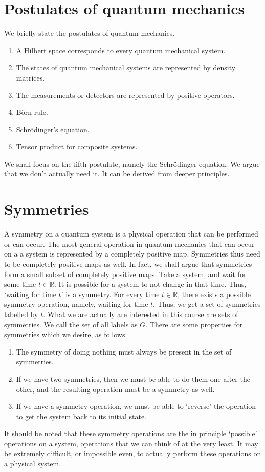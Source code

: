 \documentclass[a4 paper, 12pt]{book}
\theoremstyle{definition}
\newcommand{\rr}{\mathbb{R}}
\begin{document}
	\section{Postulates of quantum mechanics}

	We briefly state the postulates of quantum mechanics.
	\begin{enumerate}
	    \item A Hilbert space corresponds to every quantum mechanical system.
		\item The states of quantum mechanical systems are represented by density matrices.
		\item The measurements or detectors are represented by positive operators.
		\item B\"orn rule.
		\item Schr\"odinger's equation.
		\item Tensor product for composite systems.
	\end{enumerate}
	We shall focus on the fifth postulate, namely the Schr\"odinger equation. We argue that we don't actually need it. It can be derived from deeper principles.

	\section{Symmetries}

	A symmetry on a quantum system is a physical operation that can be performed or can occur. The most general operation in quantum mechanics that can occur on a a system is represented by a completely positive map. Symmetries thus need to be completely positive maps as well. In fact, we shall argue that symmetries form a small subset of completely positive maps.
	Take a system, and wait for some time \(t \in \rr\). It is possible for a system to not change in that time. Thus, `waiting for time \(t\)' is a symmetry. For every time \(t \in \rr\), there exists a possible symmetry operation, namely, waiting for time \(t\). Thus, we get a set of symmetries labelled by \(t\). What we are actually are interested in this course are sets of symmetries. We call the set of all labels as \(G\). There are some properties for symmetries which we desire, as follows.
	\begin{enumerate}
	    \item The symmetry of doing nothing must always be present in the set of symmetries.
		\item If we have two symmetries, then we must be able to do them one after the other, and the resulting operation must be a symmetry as well.
		\item If we have a symmetry operation, we must be able to `reverse' the operation to get the system back to its initial state.
	\end{enumerate}
	It should be noted that these symmetry operations are the in principle `possible' operations on a system, operations that we can think of at the very least. It may be extremely difficult, or impossible even, to actually perform these operations on a physical system.
\end{document}
